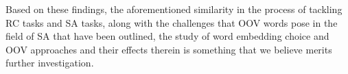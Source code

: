 \documentclass[12pt, a4paper]{report}
\theoremstyle{definition}
\theoremstyle{definition}%
\theoremstyle{definition}%
\theoremstyle{definition}%
\theoremstyle{definition}%
\theoremstyle{definition}%
\renewcommand{\cite}[1]{[\citealp{#1}]}
\begin{document}
Based on these findings, the aforementioned similarity in the process of tackling RC tasks and SA tasks, along with the challenges that OOV words pose in the field of SA that have been outlined, the study of word embedding choice and OOV approaches and their effects therein is something that we believe merits further investigation.  



\end{document}
